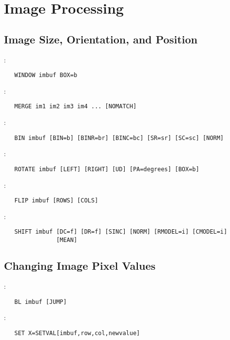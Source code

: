 
\section{Image Processing}

\subsection{Image Size, Orientation, and Position}

:
\begin{verbatim}
   WINDOW imbuf BOX=b
\end{verbatim}

\noindent {}:
\begin{verbatim}
   MERGE im1 im2 im3 im4 ... [NOMATCH]
\end{verbatim}

\noindent {}:
\begin{verbatim}
   BIN imbuf [BIN=b] [BINR=br] [BINC=bc] [SR=sr] [SC=sc] [NORM]
\end{verbatim}

\noindent {}:
\begin{verbatim}
   ROTATE imbuf [LEFT] [RIGHT] [UD] [PA=degrees] [BOX=b]
\end{verbatim}

\noindent {}:
\begin{verbatim}
   FLIP imbuf [ROWS] [COLS]
\end{verbatim}

\noindent {}:
\begin{verbatim}
   SHIFT imbuf [DC=f] [DR=f] [SINC] [NORM] [RMODEL=i] [CMODEL=i]
               [MEAN]
\end{verbatim}

\subsection{Changing Image Pixel Values}

:
\begin{verbatim}
   BL imbuf [JUMP]
\end{verbatim}

\noindent {}:
\begin{verbatim}
   SET X=SETVAL[imbuf,row,col,newvalue]
\end{verbatim}

